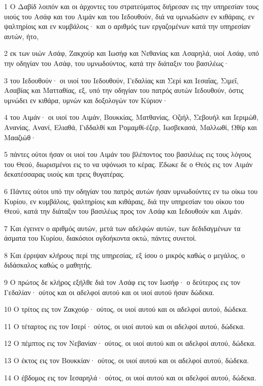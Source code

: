 \par 1 Ο Δαβίδ λοιπόν και οι άρχοντες του στρατεύματος διήρεσαν εις την υπηρεσίαν τους υιούς του Ασάφ και του Αιμάν και του Ιεδουθούν, διά να υμνωδώσιν εν κιθάραις, εν ψαλτηρίοις και εν κυμβάλοις· και ο αριθμός των εργαζομένων κατά την υπηρεσίαν αυτών, ήτο,
\par 2 εκ των υιών Ασάφ, Ζακχούρ και Ιωσήφ και Νεθανίας και Ασαρηλά, υιοί Ασάφ, υπό την οδηγίαν του Ασάφ, του υμνωδούντος, κατά την διάταξιν του βασιλέως·
\par 3 του Ιεδουθούν· οι υιοί του Ιεδουθούν, Γεδαλίας και Σερί και Ιεσαΐας, Σιμεΐ, Ασαβίας και Ματταθίας, εξ, υπό την οδηγίαν του πατρός αυτών Ιεδουθούν, όστις υμνώδει εν κιθάρα, υμνών και δοξολογών τον Κύριον·
\par 4 του Αιμάν· οι υιοί του Αιμάν, Βουκκίας, Ματθανίας, Οζιήλ, Σεβουήλ και Ιεριμώθ, Ανανίας, Ανανί, Ελιαθά, Γιδδαλθί και Ρομαμθί-έζερ, Ιωσβεκασά, Μαλλωθί, Ωθίρ και Μααζιώθ·
\par 5 πάντες ούτοι ήσαν οι υιοί του Αιμάν του βλέποντος του βασιλέως εις τους λόγους του Θεού, διωρισμένοι εις το να υψόνωσι το κέρας. Έδωκε δε ο Θεός εις τον Αιμάν δεκατέσσαρας υιούς και τρεις θυγατέρας.
\par 6 Πάντες ούτοι υπό την οδηγίαν του πατρός αυτών ήσαν υμνωδούντες εν τω οίκω του Κυρίου, εν κυμβάλοις, ψαλτηρίοις και κιθάραις, διά την υπηρεσίαν του οίκου του Θεού, κατά την διάταξιν του βασιλέως προς τον Ασάφ και Ιεδουθούν και Αιμάν.
\par 7 Και έγεινεν ο αριθμός αυτών, μετά των αδελφών αυτών, των δεδιδαγμένων τα άσματα του Κυρίου, διακόσιοι ογδοήκοντα οκτώ, πάντες συνετοί.
\par 8 Και έρριψαν κλήρους περί της υπηρεσίας, εξ ίσου ο μικρός καθώς ο μεγάλος, ο διδάσκαλος καθώς ο μαθητής.
\par 9 Ο πρώτος δε κλήρος εξήλθε διά τον Ασάφ εις τον Ιωσήφ· ο δεύτερος εις τον Γεδαλίαν· ούτος και οι αδελφοί αυτού και οι υιοί αυτού ήσαν δώδεκα.
\par 10 Ο τρίτος εις τον Ζακχούρ· ούτος, οι υιοί αυτού και οι αδελφοί αυτού, δώδεκα.
\par 11 Ο τέταρτος εις τον Ισερί· ούτος, οι υιοί αυτού και οι αδελφοί αυτού, δώδεκα.
\par 12 Ο πέμπτος εις τον Νεβανίαν· ούτος, οι υιοί αυτού και οι αδελφοί αυτού, δώδεκα.
\par 13 Ο έκτος εις τον Βουκκίαν· ούτος, οι υιοί αυτού και οι αδελφοί αυτού, δώδεκα.
\par 14 Ο έβδομος εις τον Ιεσαρηλά· ούτος, οι υιοί αυτού και οι αδελφοί αυτού, δώδεκα.
